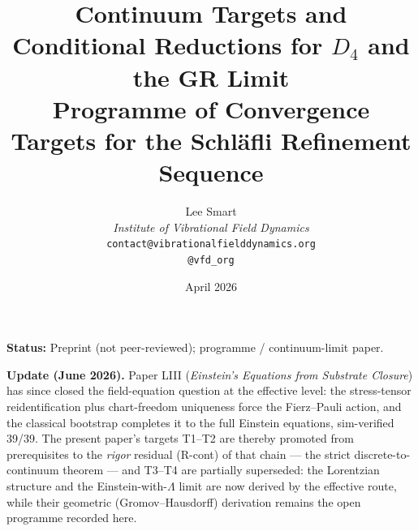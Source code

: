 \documentclass[12pt]{article}
\title{Continuum Targets and Conditional Reductions for $D_4$ and the GR Limit\\[6pt]
\large Programme of Convergence Targets for the Schl\"afli Refinement Sequence}
\author{%
  Lee Smart\\[4pt]
  \textit{Institute of Vibrational Field Dynamics}\\[2pt]
  \texttt{contact@vibrationalfielddynamics.org}\\[2pt]
  \texttt{@vfd\_org}%
}
\date{April 2026}
\theoremstyle{definition}
\theoremstyle{remark}
\begin{document}
\maketitle

\noindent\textbf{Status:} Preprint (not peer-reviewed); programme / continuum-limit paper.

\noindent\textbf{Update (June 2026).} Paper LIII (\emph{Einstein's Equations from Substrate Closure}) has since closed the field-equation question at the effective level: the stress-tensor reidentification plus chart-freedom uniqueness force the Fierz--Pauli action, and the classical bootstrap completes it to the full Einstein equations, sim-verified 39/39. The present paper's targets T1--T2 are thereby promoted from prerequisites to the \emph{rigor} residual (R-cont) of that chain --- the strict discrete-to-continuum theorem --- and T3--T4 are partially superseded: the Lorentzian structure and the Einstein-with-$\Lambda$ limit are now derived by the effective route, while their geometric (Gromov--Hausdorff) derivation remains the open programme recorded here.
\end{document}
